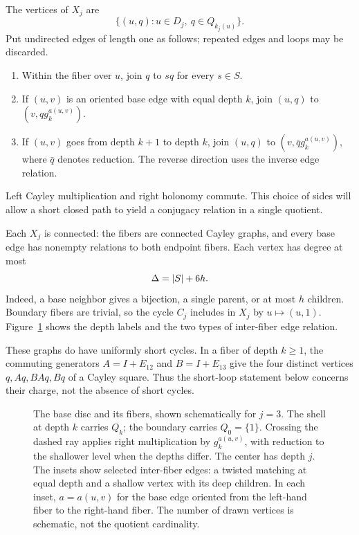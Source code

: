 The vertices of $X_j$ are
\[
 \{(u,q):u\in D_j,\ q\in Q_{k_j(u)}\}.
\]
Put undirected edges of length one as follows; repeated edges and loops
may be discarded.
\begin{enumerate}
\item Within the fiber over $u$, join $q$ to $sq$ for every $s\in S$.
\item If $(u,v)$ is an oriented base edge with equal depth $k$, join
$(u,q)$ to $(v,qg_k^{a(u,v)})$.
\item If $(u,v)$ goes from depth $k+1$ to depth $k$, join
$(u,q)$ to $(v,\bar qg_k^{a(u,v)})$, where $\bar q$ denotes reduction.
The reverse direction uses the inverse edge relation.
\end{enumerate}
Left Cayley multiplication and right holonomy commute. This choice of
sides will allow a short closed path to yield a conjugacy relation in a
single quotient.

Each $X_j$ is connected: the fibers are connected Cayley graphs, and every
base edge has nonempty relations to both endpoint fibers. Each vertex has
degree at most
\begin{equation}\label{eq:degree}
 \Delta=\lvert S\rvert+6h.
\end{equation}
Indeed, a base neighbor gives a bijection, a single parent, or at most $h$
children. Boundary fibers are trivial, so the cycle $C_j$ includes in $X_j$
by $u\mapsto(u,1)$. Figure~\ref{fig:disc} shows the depth labels and
the two types of inter-fiber edge relation.

These graphs do have uniformly short cycles. In a fiber of depth $k\ge1$,
the commuting generators $A=I+E_{12}$ and $B=I+E_{13}$ give the four
distinct vertices $q,Aq,BAq,Bq$ of a Cayley square. Thus the short-loop
statement below concerns their charge, not the absence of short cycles.

\begin{figure}[t]
\centering

\caption{The base disc and its fibers, shown schematically for $j=3$.
The shell at depth $k$ carries $Q_k$; the boundary carries $Q_0=\{1\}$.
Crossing the dashed ray applies right multiplication by $g_k^{a(u,v)}$,
with reduction to the shallower level when the depths differ. The center
has depth $j$. The insets show selected inter-fiber edges: a twisted
matching at equal depth and a shallow vertex with its deep children.
In each inset, $a=a(u,v)$ for the base edge oriented from the left-hand
fiber to the right-hand fiber.
The number of drawn vertices is schematic, not the quotient cardinality.}
\label{fig:disc}
\end{figure}

